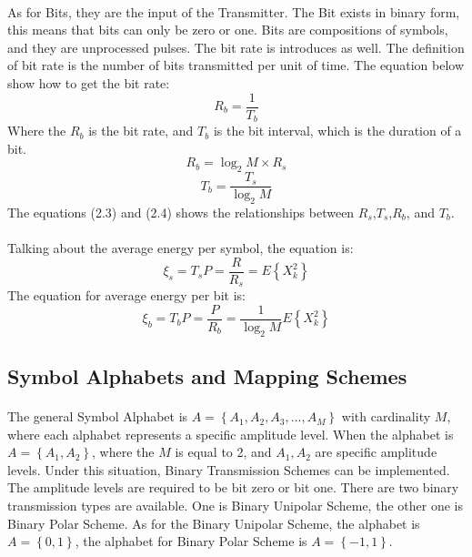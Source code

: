 \documentclass[12pt]{article}
\begin{document}
    \paragraph{}
    As for Bits, they are the input of the Transmitter. The Bit exists in binary form, this means that bits can only be zero or one. Bits are compositions of symbols, and they are unprocessed pulses. The bit rate is introduces as well. The definition of bit rate is the number of bits transmitted per unit of time. The equation below show how to get the bit rate:
    \begin{equation}
        R_b=\frac{1}{T_b}
    \end{equation}
    Where the $R_b$ is the bit rate, and $T_b$ is the bit interval, which is the duration of a bit.
    \begin{equation}
        R_b=\log_2M\times R_s
    \end{equation}
    \begin{equation}
        T_b=\frac{T_s}{\log_2M}
    \end{equation}
    The equations (2.3) and (2.4) shows the relationships between
    $R_s$,$T_s$,$R_b$, and $T_b$. 
    \paragraph{}
    Talking about the average energy per symbol, the equation is:
    \begin{equation}
        \xi_s=T_sP=\frac{R}{R_s} =E\left \{ X_k^2 \right \}
    \end{equation}
    The equation for average energy per bit is:
    \begin{equation}
        \xi_b=T_bP=\frac{P}{R_b}=\frac{1}{\log_2M}E\left \{ X_k^2 \right \}
    \end{equation}
    
    \subsection{Symbol Alphabets and Mapping Schemes}
    \paragraph{}
    The general Symbol Alphabet is $A=\left \{ A_1,A_2,A_3,...,A_M\right \}$ with cardinality $M$, where each alphabet represents a specific amplitude level\cite{4}. When the alphabet is $A=\left \{A_1,A_2  \right \}$, where the $M$ is equal to 2, and $A_1,A_2$ are specific amplitude levels. Under this situation, Binary Transmission Schemes can be implemented. The amplitude levels are required to be bit zero or bit one. There are two binary transmission types are available. One is Binary Unipolar Scheme, the other one is Binary Polar Scheme. As for the Binary Unipolar Scheme, the alphabet is $A=\left \{0,1  \right \}$, the alphabet for Binary Polar Scheme is $A=\left \{-1,1  \right \}$.
    
\end{document}
